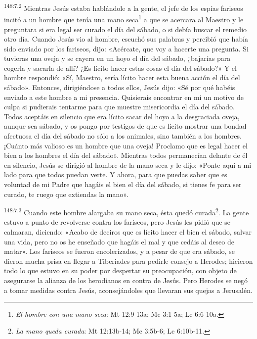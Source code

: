 \par 
\textsuperscript{148:7.2} Mientras Jesús estaba hablándole a la gente, el jefe de los espías fariseos incitó a un hombre que tenía una mano seca\footnote{\textit{El hombre con una mano seca}: Mt 12:9-13a; Mc 3:1-5a; Lc 6:6-10a.} a que se acercara al Maestro y le preguntara si era legal ser curado el día del sábado, o si debía buscar el remedio otro día. Cuando Jesús vio al hombre, escuchó sus palabras y percibió que había sido enviado por los fariseos, dijo: «Acércate, que voy a hacerte una pregunta. Si tuvieras una oveja y se cayera en un hoyo el día del sábado, ¿bajarías para cogerla y sacarla de allí? ¿Es lícito hacer estas cosas el día del sábado?» Y el hombre respondió: «Sí, Maestro, sería lícito hacer esta buena acción el día del sábado». Entonces, dirigiéndose a todos ellos, Jesús dijo: «Sé por qué habéis enviado a este hombre a mi presencia. Quisierais encontrar en mí un motivo de culpa si pudierais tentarme para que muestre misericordia el día del sábado. Todos aceptáis en silencio que era lícito sacar del hoyo a la desgraciada oveja, aunque sea sábado, y os pongo por testigos de que es lícito mostrar una bondad afectuosa el día del sábado no sólo a los animales, sino también a los hombres. ¡Cuánto más valioso es un hombre que una oveja! Proclamo que es legal hacer el bien a los hombres el día del sábado». Mientras todos permanecían delante de él en silencio, Jesús se dirigió al hombre de la mano seca y le dijo: «Ponte aquí a mi lado para que todos puedan verte. Y ahora, para que puedas saber que es voluntad de mi Padre que hagáis el bien el día del sábado, si tienes fe para ser curado, te ruego que extiendas la mano».

\par 
\textsuperscript{148:7.3} Cuando este hombre alargaba su mano seca, ésta quedó curada\footnote{\textit{La mano queda curada}: Mt 12:13b-14; Mc 3:5b-6; Lc 6:10b-11.}. La gente estuvo a punto de revolverse contra los fariseos, pero Jesús les pidió que se calmaran, diciendo: «Acabo de deciros que es lícito hacer el bien el sábado, salvar una vida, pero no os he enseñado que hagáis el mal y que cedáis al deseo de matar». Los fariseos se fueron encolerizados, y a pesar de que era sábado, se dieron mucha prisa en llegar a Tiberiades para pedirle consejo a Herodes; hicieron todo lo que estuvo en su poder por despertar su preocupación, con objeto de asegurarse la alianza de los herodianos en contra de Jesús. Pero Herodes se negó a tomar medidas contra Jesús, aconsejándoles que llevaran sus quejas a Jerusalén.

